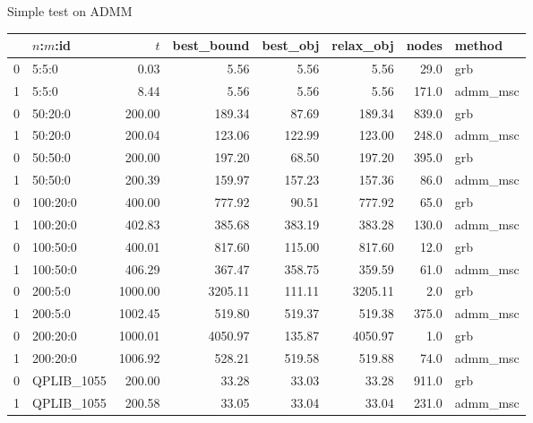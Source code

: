 \begin{frame}{Simple test on ADMM}
  \begin{tabular}{llrrrrrl}
    \toprule
    {} & $n$:$m$:id  & $t$     & best\_bound & best\_obj & relax\_obj & nodes & method    \\
    \midrule
    0  & 5:5:0       & 0.03    & 5.56        & 5.56      & 5.56       & 29.0  & grb       \\
    1  & 5:5:0       & 8.44    & 5.56        & 5.56      & 5.56       & 171.0 & admm\_msc \\
    0  & 50:20:0     & 200.00  & 189.34      & 87.69     & 189.34     & 839.0 & grb       \\
    1  & 50:20:0     & 200.04  & 123.06      & 122.99    & 123.00     & 248.0 & admm\_msc \\
    0  & 50:50:0     & 200.00  & 197.20      & 68.50     & 197.20     & 395.0 & grb       \\
    1  & 50:50:0     & 200.39  & 159.97      & 157.23    & 157.36     & 86.0  & admm\_msc \\
    0  & 100:20:0    & 400.00  & 777.92      & 90.51     & 777.92     & 65.0  & grb       \\
    1  & 100:20:0    & 402.83  & 385.68      & 383.19    & 383.28     & 130.0 & admm\_msc \\
    0  & 100:50:0    & 400.01  & 817.60      & 115.00    & 817.60     & 12.0  & grb       \\
    1  & 100:50:0    & 406.29  & 367.47      & 358.75    & 359.59     & 61.0  & admm\_msc \\
    0  & 200:5:0     & 1000.00 & 3205.11     & 111.11    & 3205.11    & 2.0   & grb       \\
    1  & 200:5:0     & 1002.45 & 519.80      & 519.37    & 519.38     & 375.0 & admm\_msc \\
    0  & 200:20:0    & 1000.01 & 4050.97     & 135.87    & 4050.97    & 1.0   & grb       \\
    1  & 200:20:0    & 1006.92 & 528.21      & 519.58    & 519.88     & 74.0  & admm\_msc \\
    0  & QPLIB\_1055 & 200.00  & 33.28       & 33.03     & 33.28      & 911.0 & grb       \\
    1  & QPLIB\_1055 & 200.58  & 33.05       & 33.04     & 33.04      & 231.0 & admm\_msc \\
    \bottomrule
  \end{tabular}
\end{frame}
\begin{frame}
  \scriptsize
  \printbibliography
\end{frame}
